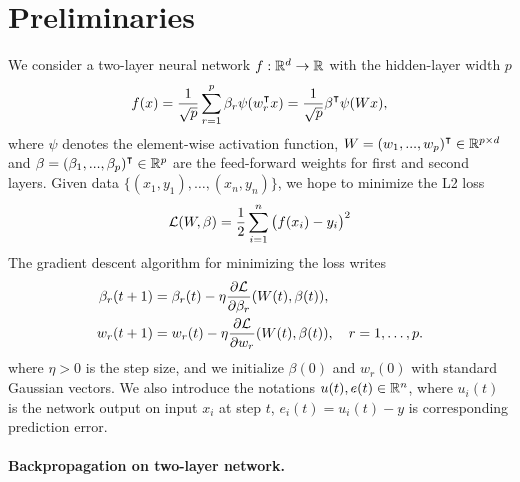 \section{Preliminaries}

We consider a two-layer neural network $f:\mathbb{R}^d \to \mathbb{R}$ with the hidden-layer width $p$
\begin{align}\label{eqn:nonlinear-network}
    f(x) = \frac{1}{\sqrt p}\sum_{r=1}^p\beta_r\psi(w_r\transpose x)= \frac{1}{\sqrt p}\beta\transpose\psi(Wx),
\end{align}
where $\psi$ denotes the element-wise activation function, $W = (w_1,...,w_p)\transpose\in\Rpd$ and $\beta = (\beta_1,...,\beta_p)\transpose\in\Rp$ are the feed-forward weights for first and second layers.
Given data $\{(x_1,y_1),\ldots,(x_n,y_n)\}$, we hope to minimize the L2 loss
\begin{equation}
    \mathcal{L}(W,\beta) = \frac{1}{2}\sum_{i=1}^n \big(f(x_i)-y_i\big)^2
\end{equation}
The gradient descent algorithm for minimizing the loss writes
\begin{align*}
    \beta_r(t+1) &= \beta_r(t)-\eta\frac{\partial\mathcal{L}}{\partial \beta_r}(W(t),\beta(t)), \\
    w_r(t+1) &= w_r(t)-\eta\frac{\partial\mathcal{L}}{\partial w_r}(W(t),\beta(t)), \quad r=1,\ldots,p.
\end{align*}
where $\eta>0$ is the step size, and we initialize $\beta(0)$ and $w_r(0)$ with standard Gaussian vectors. We also introduce the notations $u(t),e(t)\in \mathbb{R}^n$, where $u_i(t)$ is the network output on input $x_i$ at step $t$, $e_i(t) = u_i(t)-y$ is corresponding prediction error.

\paragraph{Backpropagation on two-layer network.}

